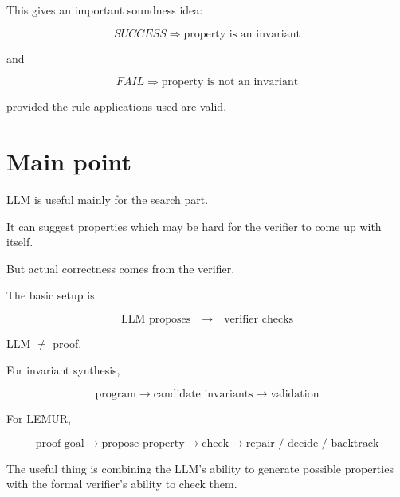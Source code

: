 \documentclass[11pt]{book}
\begin{document}
This gives an important soundness idea:

\[
SUCCESS \Rightarrow \text{property is an invariant}
\]

and

\[
FAIL \Rightarrow \text{property is not an invariant}
\]

provided the rule applications used are valid.

\section{Main point}

LLM is useful mainly for the search part.

It can suggest properties which may be hard for
the verifier to come up with itself.

But actual correctness comes from the verifier.

\begin{ppkey}
The basic setup is

\[
\boxed{
\text{LLM proposes}
\quad\rightarrow\quad
\text{verifier checks}
}
\]

LLM $\neq$ proof.
\end{ppkey}

For invariant synthesis,

\[
\text{program}
\rightarrow
\text{candidate invariants}
\rightarrow
\text{validation}
\]

For LEMUR,

\[
\text{proof goal}
\rightarrow
\text{propose property}
\rightarrow
\text{check}
\rightarrow
\text{repair / decide / backtrack}
\]

The useful thing is combining the LLM's ability to
generate possible properties with the formal verifier's
ability to check them.
\end{document}
